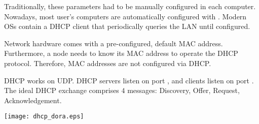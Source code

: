 Traditionally, these parameters had to be manually configured in each computer.
Nowadays, most user's computers are automatically configured with .
Modern OSs contain a DHCP client that periodically queries the LAN until configured.

\begin{remark}
Network hardware comes with a pre-configured, default MAC address.
Furthermore, a node needs to know its MAC address to operate the DHCP protocol.
Therefore, MAC addresses are not configured via DHCP.
\end{remark}

\newpage
DHCP works on UDP. DHCP servers listen on port , and clients 
listen on port . The ideal DHCP exchange comprises $4$ messages:
Discovery, Offer, Request, Acknowledgement.

\begin{center}
\texttt{[image: dhcp\_dora.eps]}
\end{center}

